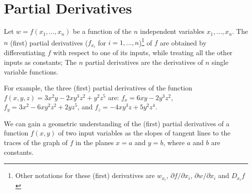 \documentclass[13pt,letterpaper,fleqn]{article}
\begin{document}
\section*{Partial Derivatives}
Let $w = f(x_1,\ldots,x_n)$ be a function of the $n$ independent variables $x_1,\ldots,x_n$. The $n$ (first) partial derivatives ($f_{x_i}$ for $i=1,\ldots,n$)\footnote{Other notations for these (first) derivatives are $w_{x_i}$, $\partial f/\partial x_i$, $\partial w/\partial x_i$ and $D_{x_i}f$} of $f$ are obtained by differentiating $f$ with respect to one of its inputs, while treating all the other inputs as constants; The $n$ partial derivatives are the derivatives of $n$ single variable functions.

For example, the three (first) partial derivatives of the function $f(x,y,z) = 3x^2 y - 2xy^3 z^2 + y^2 z^5$ are: $f_x = 6xy - 2y^3 z^2$, $f_y = 3x^2 - 6xy^2 z^2 + 2y z^5$, and $f_z = -4xy^3 z + 5y^2 z^4$.

We can gain a geometric understanding of the (first) partial derivatives of a function $f(x,y)$ of two input variables as the slopes of tangent lines to the traces of the graph of $f$ in the planes $x = a$ and $y = b$, where $a$ and $b$ are constants.
\end{document}
